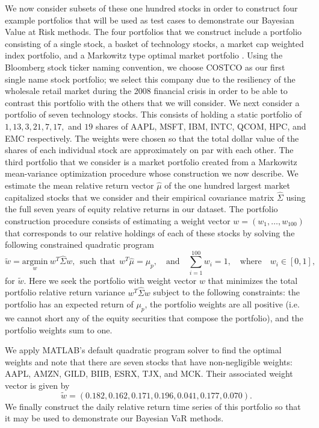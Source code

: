 \documentclass{amsart}
\begin{document}
We now consider subsets of these one hundred stocks in order to construct 
four example portfolios that will be used as test cases to 
demonstrate our Bayesian Value at Risk methods.
The four portfolios that we construct include 
a portfolio consisting of a single stock, a basket of technology stocks, a
market cap weighted index portfolio, and a Markowitz type optimal market portfolio 
\cite{Markowitz-52}.  Using the Bloomberg stock ticker naming convention, we choose COSTCO 
as our first single name stock portfolio; we select this company due to the 
resiliency of the wholesale retail market during the 2008 financial crisis in order to 
be able to contrast this portfolio with the others that we will consider. 
We next consider a portfolio of seven technology stocks.  This 
consists of holding a static portfolio of $1, 13, 3, 21, 7, 17,$ and $19$ shares of 
AAPL, MSFT, IBM, INTC, QCOM, HPC, and EMC respectively. The weights were chosen 
so that the total dollar value of the shares of each individual stock are approximately on par 
with each other. 
The third portfolio that we consider is a 
market portfolio created from a Markowitz mean-variance optimization procedure whose 
construction we now describe.  
We estimate the mean relative return vector $\hat{\mu}$ of the one hundred largest market 
capitalized stocks that we consider  
and their empirical covariance matrix $\hat{\Sigma}$ using the full seven years of 
equity relative returns in our dataset.  
The portfolio construction procedure consists of estimating a weight vector $w = (w_1,\ldots,w_{100})$ 
that corresponds to our relative holdings of each 
of these stocks by solving the following constrained quadratic program 
%
\begin{equation}
    \tilde{w}=\underset{w}{\mathrm{argmin}} \:w^T\hat{\Sigma} w,\:\:\mathrm{such\:\:that\:\:} w^T\hat{\mu}
    = \mu_p,
    \quad \mathrm{and}\quad 
    \sum_{i=1}^{100} w_i = 1,\quad \mathrm{where}\quad w_i\in[0,1],
\end{equation}
%
for $\tilde{w}$. Here we seek the portfolio with weight vector $w$ that minimizes the
total portfolio relative return variance 
$w^T\hat{\Sigma}w$  subject to the following constraints: the portfolio has an expected return of $\mu_p$, 
the portfolio weights are all positive (i.e. we cannot short any of the equity securities 
that compose the portfolio), and the portfolio weights sum to one. 

We apply MATLAB's default quadratic program solver to find the optimal weights  
and note that there are seven stocks that have non-negligible weights:    
AAPL, AMZN, GILD, BIIB, ESRX, TJX, and MCK.  Their associated weight vector is given by
%
\begin{equation}
\tilde{w} = (0.182,0.162,0.171,0.196,0.041, 0.177,0.070).
\end{equation}
We finally construct the daily 
relative return time series of this portfolio so that it may be used to demonstrate our Bayesian 
VaR methods. 
\end{document}
